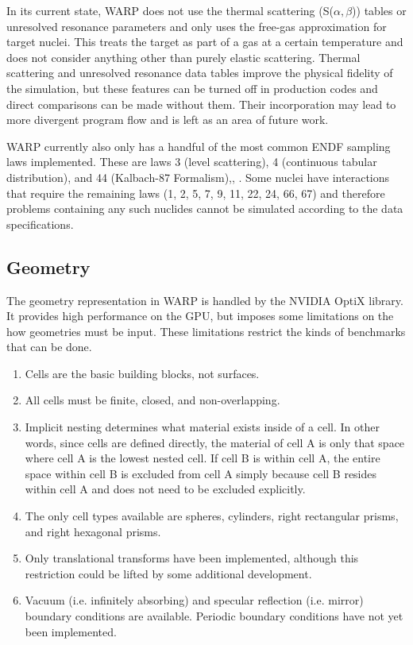 \documentclass[preprint,12pt]{elsarticle}
\begin{document}
In its current state, WARP does not use the thermal scattering (S($\alpha,$$\beta$)) tables or unresolved resonance parameters and only uses the free-gas approximation for target nuclei.  This treats the target as part of a gas at a certain temperature and does not consider anything other than purely elastic scattering. Thermal scattering and unresolved resonance data tables improve the physical fidelity of the simulation, but these features can be turned off in production codes and direct comparisons can be made without them.  Their incorporation may lead to more divergent program flow and is left as an area of future work.

WARP currently also only has a handful of the most common ENDF sampling laws implemented.   These are laws 3 (level scattering), 4 (continuous tabular distribution), and 44 (Kalbach-87 Formalism),, \cite{MCNP}.  Some nuclei have interactions that require the remaining laws (1, 2, 5, 7, 9, 11, 22, 24, 66, 67) and therefore problems containing any such nuclides cannot be simulated according to the data specifications.

\subsection{Geometry}

The geometry representation in WARP is handled by the NVIDIA OptiX library.  It provides high performance on the GPU, but imposes some limitations on the how geometries must be input.  These limitations restrict the kinds of benchmarks that can be done.

\begin{enumerate}
\item Cells are the basic building blocks, not surfaces.
\item All cells must be finite, closed, and non-overlapping.
\item Implicit nesting determines what material exists inside of a cell.  In other words, since cells are defined directly, the material of cell A is only that space where cell A is the lowest nested cell.  If cell B is within cell A, the entire space within cell B is excluded from cell A simply because cell B resides within cell A and does not need to be excluded explicitly.
\item The only cell types available are spheres, cylinders, right rectangular prisms, and right hexagonal prisms.
\item Only translational transforms have been implemented, although this restriction could be lifted by some additional development.
\item Vacuum (i.e. infinitely absorbing) and specular reflection  (i.e. mirror) boundary conditions are available.  Periodic boundary conditions have not yet been implemented.
\end{enumerate}
\end{document}
